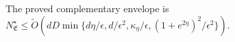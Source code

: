 The proved complementary envelope is \(N^\star_{\mathfrak E}\le\widetilde O(dD\min\{d\eta/\epsilon,d/\epsilon^2,\kappa_\eta/\epsilon,(1+e^{2\eta})^2/\epsilon^2\})\).